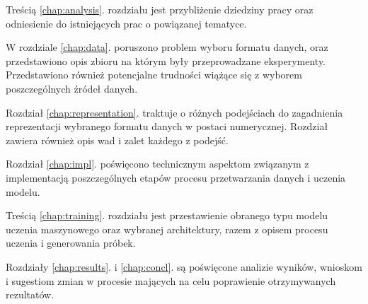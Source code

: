 {{        Treścią \ref{chap:analysis}. rozdziału jest przybliżenie dziedziny pracy oraz odniesienie do istniejących prac o powiązanej tematyce.
        
        W rozdziale \ref{chap:data}. poruszono problem wyboru formatu danych, oraz przedstawiono opis zbioru na którym
        były przeprowadzane eksperymenty. Przedstawiono również potencjalne trudności wiążące się z wyborem
        poszczególnych źródeł danych.

        Rozdział \ref{chap:representation}. traktuje o różnych podejściach do zagadnienia reprezentacji wybranego formatu 
        danych w postaci numerycznej. Rozdział zawiera również opis wad i zalet każdego z podejść.

        Rozdział \ref{chap:impl}. poświęcono technicznym aspektom związanym z implementacją poszczególnych etapów procesu 
        przetwarzania danych i uczenia modelu.
        
        Treścią \ref{chap:training}. rozdziału jest przestawienie obranego typu modelu uczenia maszynowego oraz 
        wybranej architektury, razem z opisem procesu uczenia i generowania próbek.

        Rozdziały \ref{chap:results}. i \ref{chap:concl}. są poświęcone analizie wyników, wnioskom i sugestiom zmian w procesie mających na celu 
        poprawienie otrzymywanych rezultatów.
    }
}


